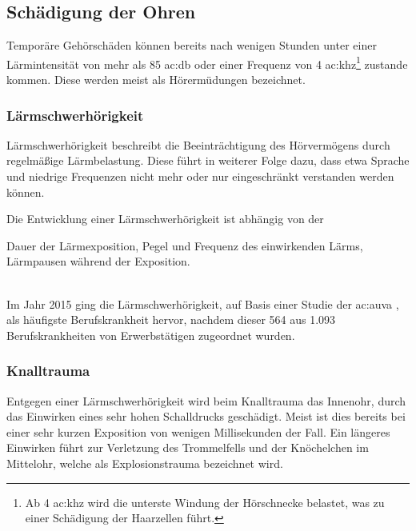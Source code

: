 
\subsection{Schädigung der Ohren}
Temporäre Gehörschäden können bereits nach wenigen Stunden unter einer Lärmintensität von mehr als 85 \gls{ac:db} oder einer Frequenz von 4 \gls{ac:khz}\footnote{Ab 4 \gls{ac:khz} wird die unterste Windung der Hörschnecke belastet, was zu einer Schädigung der Haarzellen führt.} zustande kommen. Diese werden meist als Hörermüdungen bezeichnet.

\subsubsection{Lärmschwerhörigkeit}
Lärmschwerhörigkeit beschreibt die Beeinträchtigung des Hörvermögens durch regelmäßige Lärmbelastung. Diese führt in weiterer Folge dazu, dass etwa Sprache und niedrige Frequenzen nicht mehr oder nur eingeschränkt verstanden werden können.

Die Entwicklung einer Lärmschwerhörigkeit ist abhängig von der
\begin{outline}
	\1 Dauer der Lärmexposition,
	\1 Pegel und Frequenz des einwirkenden Lärms,
	\1 Lärmpausen während der Exposition.
\end{outline}

~\\
Im Jahr 2015 ging die Lärmschwerhörigkeit, auf Basis einer Studie der \gls{ac:auva} \cite{auva:berufskrankheit}, als häufigste Berufskrankheit hervor, nachdem dieser 564 aus 1.093 Berufskrankheiten von Erwerbstätigen zugeordnet wurden.

\subsubsection{Knalltrauma}
Entgegen einer Lärmschwerhörigkeit wird beim Knalltrauma das Innenohr, durch das Einwirken eines sehr hohen Schalldrucks geschädigt. Meist ist dies bereits bei einer sehr kurzen Exposition von wenigen Millisekunden der Fall. Ein längeres Einwirken führt zur Verletzung des Trommelfells und der Knöchelchen im Mittelohr, welche als Explosionstrauma bezeichnet wird.

